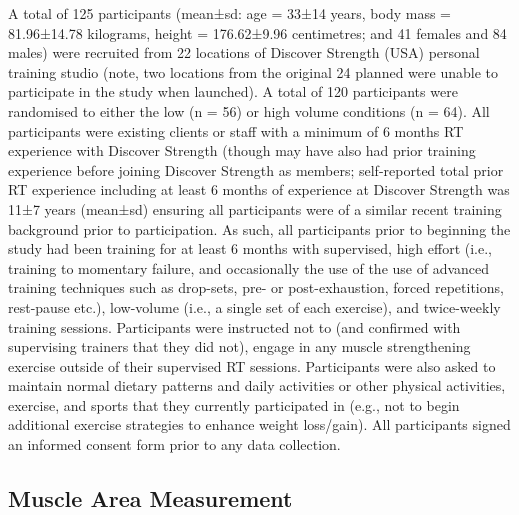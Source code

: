 \documentclass[
]{article}
\begin{document}
A total of 125 participants (mean±sd: age = 33±14 years, body mass =
81.96±14.78 kilograms, height = 176.62±9.96 centimetres; and 41 females
and 84 males) were recruited from 22 locations of Discover Strength
(USA) personal training studio (note, two locations from the original 24
planned were unable to participate in the study when launched). A total
of 120 participants were randomised to either the low (n = 56) or high
volume conditions (n = 64). All participants were existing clients or
staff with a minimum of 6 months RT experience with Discover Strength
(though may have also had prior training experience before joining
Discover Strength as members; self-reported total prior RT experience
including at least 6 months of experience at Discover Strength was 11±7
years (mean±sd) ensuring all participants were of a similar recent
training background prior to participation. As such, all participants
prior to beginning the study had been training for at least 6 months
with supervised, high effort (i.e., training to momentary failure, and
occasionally the use of the use of advanced training techniques such as
drop-sets, pre- or post-exhaustion, forced repetitions, rest-pause
etc.), low-volume (i.e., a single set of each exercise), and
twice-weekly training sessions. Participants were instructed not to (and
confirmed with supervising trainers that they did not), engage in any
muscle strengthening exercise outside of their supervised RT sessions.
Participants were also asked to maintain normal dietary patterns and
daily activities or other physical activities, exercise, and sports that
they currently participated in (e.g., not to begin additional exercise
strategies to enhance weight loss/gain). All participants signed an
informed consent form prior to any data collection.

\subsection{Muscle Area Measurement}\label{muscle-area-measurement}
\end{document}
